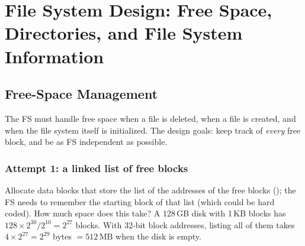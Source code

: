\let\oldsectionmark\sectionmark
\renewcommand{\sectionmark}[1]{\markright{\thesection.\ File System Design: Free Space, Directories, FS Info}}
\section{File System Design: Free Space, Directories, and File System Information}
\let\sectionmark\oldsectionmark
\label{sec:fsmeta}

\subsection{Free-Space Management}

The FS must handle free space when a file is deleted, when a file is created, and when the file system itself is initialized. The design goals: keep track of \emph{every} free block, and be as FS independent as possible.

\subsubsection{Attempt 1: a linked list of free blocks}
Allocate data blocks that store the list of the addresses of the free blocks (); the FS needs to remember the starting block of that list (which could be hard coded). How much space does this take? A 128\,GB disk with 1\,KB blocks has $128 \times 2^{30} / 2^{10} = 2^{27}$ blocks. With 32-bit block addresses, listing all of them takes $4 \times 2^{27} = 2^{29}$ bytes $= 512\,\text{MB}$ when the disk is empty.

